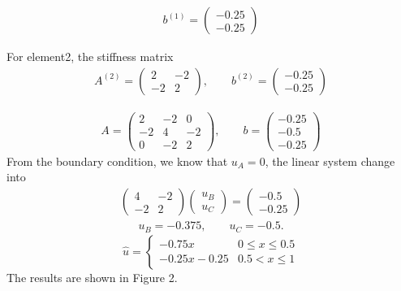 \documentclass{article}
\begin{document}
\begin{gather*}
b^{(1)}=
\begin{pmatrix}
-0.25 \\
-0.25
\end{pmatrix}
\end{gather*}


For element2, the stiffness matrix
\begin{gather*}
A^{(2)}=
\begin{pmatrix}
2 & -2\\
-2 & 2
\end{pmatrix}, \qquad
b^{(2)}=
\begin{pmatrix}
-0.25 \\
-0.25
\end{pmatrix}
\end{gather*}



\begin{gather*}
A=
\begin{pmatrix}
2 & -2 &0\\
-2 & 4 & -2\\
0& -2 &2
\end{pmatrix}, \qquad
b=
\begin{pmatrix}
-0.25 \\
-0.5\\
-0.25
\end{pmatrix}
\end{gather*}
From the boundary condition, we know that $u_{A}=0$, the linear system change into
\begin{gather*}
\begin{pmatrix}
4 &-2\\
-2 &2
\end{pmatrix}
\begin{pmatrix}
u_{B} \\
u_{C}
\end{pmatrix}=
\begin{pmatrix}
-0.5\\
-0.25
\end{pmatrix}
\end{gather*}
\begin{gather*}
u_{B}= -0.375, \qquad u_{C}= -0.5.
\end{gather*}
\begin{equation}
\hat{u}=
\begin{cases}
-0.75x & \text{$\displaystyle 0\leq x \leq 0.5$}\\
-0.25x-0.25 & \text{$\displaystyle 0.5 <x \leq 1$}
\end{cases}
\end{equation}
The results are shown in Figure 2.
\end{document}
